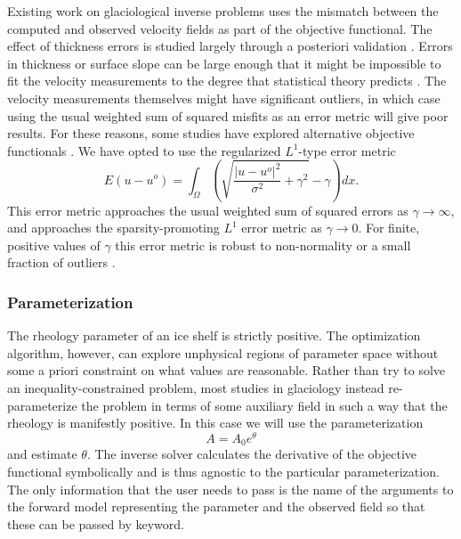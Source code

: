 \documentclass[journal abbreviation, manuscript]{copernicus}
\begin{document}
Existing work on glaciological inverse problems uses the mismatch between the computed and observed velocity fields as part of the objective functional.
The effect of thickness errors is studied largely through a posteriori validation \citep{joughin2004basal, larour2005rheology}.
Errors in thickness or surface slope can be large enough that it might be impossible to fit the velocity measurements to the degree that statistical theory predicts \citep{macayeal1995basal}.
The velocity measurements themselves might have significant outliers, in which case using the usual weighted sum of squared misfits as an error metric will give poor results.
For these reasons, some studies have explored alternative objective functionals \citep{morlighem2010spatial}.
We have opted to use the regularized $L^1$-type error metric
\begin{equation}
    E(u - u^o) = \int_\Omega\left(\sqrt{\frac{|u - u^o|^2}{\sigma^2} + \gamma^2} - \gamma\right)dx.
    \label{eq:l1-error-metric}
\end{equation}
This error metric approaches the usual weighted sum of squared errors as $\gamma \to \infty$, and approaches the sparsity-promoting $L^1$ error metric as $\gamma \to 0$.
For finite, positive values of $\gamma$ this error metric is robust to non-normality or a small fraction of outliers \citep{barron2019general}.


\subsubsection{Parameterization}

The rheology parameter of an ice shelf is strictly positive.
The optimization algorithm, however, can explore unphysical regions of parameter space without some a priori constraint on what values are reasonable.
Rather than try to solve an inequality-constrained problem, most studies in glaciology instead re-parameterize the problem in terms of some auxiliary field in such a way that the rheology is manifestly positive.
In this case we will use the parameterization
\begin{equation}
    A = A_0e^{\theta}
\end{equation}
and estimate $\theta$.
The inverse solver calculates the derivative of the objective functional symbolically and is thus agnostic to the particular parameterization.
The only information that the user needs to pass is the name of the arguments to the forward model representing the parameter and the observed field so that these can be passed by keyword.
\end{document}
